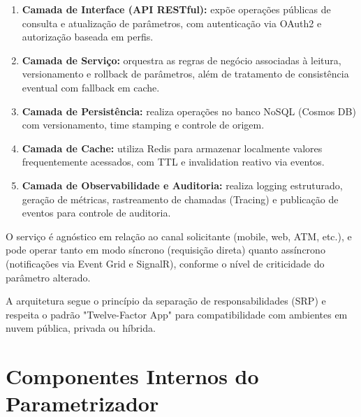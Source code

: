 \begin{enumerate}
	\item \textbf{Camada de Interface (API RESTful):} expõe operações públicas de consulta e atualização de parâmetros, com autenticação via OAuth2 e autorização baseada em perfis.
	\item \textbf{Camada de Serviço:} orquestra as regras de negócio associadas à leitura, versionamento e rollback de parâmetros, além de tratamento de consistência eventual com fallback em cache.
	\item \textbf{Camada de Persistência:} realiza operações no banco NoSQL (Cosmos DB) com versionamento, time stamping e controle de origem.
	\item \textbf{Camada de Cache:} utiliza Redis para armazenar localmente valores frequentemente acessados, com TTL e invalidation reativo via eventos.
	\item \textbf{Camada de Observabilidade e Auditoria:} realiza logging estruturado, geração de métricas, rastreamento de chamadas (Tracing) e publicação de eventos para controle de auditoria.
	
	
\end{enumerate}

O serviço é agnóstico em relação ao canal solicitante (mobile, web, ATM, etc.), e pode operar tanto em modo síncrono (requisição direta) quanto assíncrono (notificações via Event Grid e SignalR), conforme o nível de criticidade do parâmetro alterado.

A arquitetura segue o princípio da separação de responsabilidades (SRP) e respeita o padrão "Twelve-Factor App" para compatibilidade com ambientes em nuvem pública, privada ou híbrida.

\section{Componentes Internos do Parametrizador}

